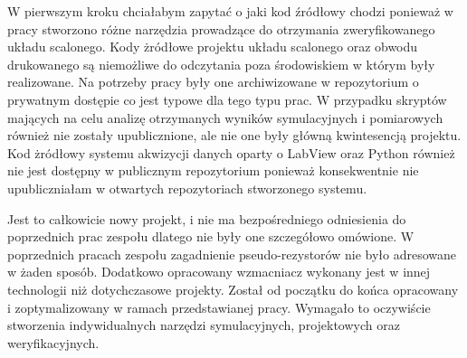 \begin{frame}[t]
    \begin{block}{\tb}
    \end{block}
    W pierwszym kroku chciałabym zapytać o jaki kod źródłowy chodzi ponieważ w pracy stworzono różne narzędzia prowadzące do otrzymania zweryfikowanego układu scalonego. 
    Kody żródłowe projektu układu scalonego oraz obwodu drukowanego są niemożliwe do odczytania poza środowiskiem w którym były realizowane.
    Na potrzeby pracy były one archiwizowane w repozytorium o prywatnym dostępie co jest typowe dla tego typu prac.
    W przypadku skryptów mających na celu analizę otrzymanych wyników symulacyjnych i pomiarowych również nie zostały upublicznione, ale nie one były główną kwintesencją projektu.
    Kod żródłowy systemu akwizycji danych oparty o LabView oraz Python również nie jest dostępny w publicznym repozytorium ponieważ konsekwentnie nie upubliczniałam w otwartych repozytoriach stworzonego systemu.
    
\end{frame}
\begin{frame}[t]
    \begin{block}{\tb}
    \end{block}

Jest to całkowicie nowy projekt, i nie ma bezpośredniego odniesienia do poprzednich prac zespołu dlatego nie były one szczegółowo omówione.
W poprzednich pracach zespołu zagadnienie pseudo-rezystorów nie było adresowane w żaden sposób.
Dodatkowo opracowany wzmacniacz wykonany jest w innej technologii niż dotychczasowe projekty.
Został od początku do końca opracowany i zoptymalizowany w ramach przedstawianej pracy.
Wymagało to oczywiście stworzenia indywidualnych narzędzi symulacyjnych, projektowych oraz weryfikacyjnych. 

\end{frame}


